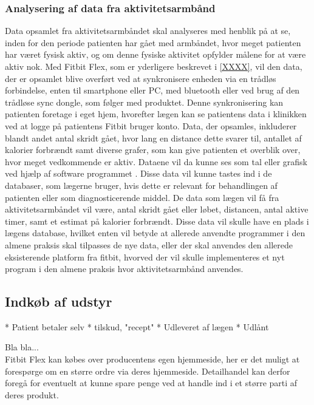 \subsubsection{Analysering af data fra aktivitetsarmbånd}  
Data opsamlet fra aktivitetsarmbåndet skal analyseres med henblik på at se, inden for den periode patienten har gået med armbåndet, hvor meget patienten har været fysisk aktiv, og om denne fysiske aktivitet opfylder målene for at være aktiv nok.  
Med Fitbit Flex, som er yderligere beskrevet i \autoref{XXXX}, vil den data, der er opsamlet blive overført ved at synkronisere enheden via en trådløs forbindelse, enten til smartphone eller PC, med bluetooth eller ved brug af den trådløse sync dongle, som følger med produktet. Denne synkronisering kan patienten foretage i eget hjem, hvorefter lægen kan se patientens data i klinikken ved at logge på patientens Fitbit bruger konto. Data, der opsamles, inkluderer blandt andet antal skridt gået, hvor lang en distance dette svarer til, antallet af kalorier forbrændt samt diverse grafer, som kan give patienten et overblik over, hvor meget vedkommende er aktiv. Dataene vil da kunne ses som tal eller grafisk ved hjælp af software programmet \citep{fitbitflex}. Disse data vil kunne tastes ind i de databaser, som lægerne bruger, hvis dette er relevant for behandlingen af patienten eller som diagnosticerende middel. De data som lægen vil få fra aktivitetsarmbåndet vil være, antal skridt gået eller løbet, distancen, antal aktive timer, samt et estimat på kalorier forbrændt. Disse data vil skulle have en plads i lægens database, hvilket enten vil betyde at allerede anvendte programmer i den almene praksis skal tilpasses de nye data, eller der skal anvendes den allerede eksisterende platform fra fitbit, hvorved der vil skulle implementeres et nyt program i den almene praksis hvor aktivitetsarmbånd anvendes. 

\subsection{Indkøb af udstyr}	


* Patient betaler selv
* tilskud, "recept"
* Udleveret af lægen
* Udlånt 
 
Bla bla...\\
Fitbit Flex kan købes over producentens egen hjemmeside, her er det muligt at forespørge om en større ordre via deres hjemmeside. Detailhandel kan derfor foregå for eventuelt at kunne spare penge ved at handle ind i et større parti af deres produkt.

